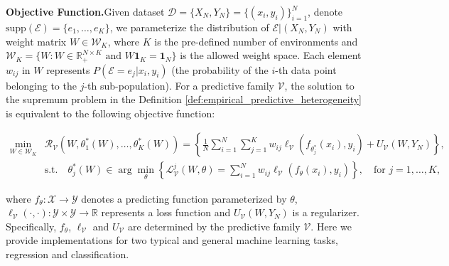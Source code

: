 \textbf{Objective Function.}\quad Given dataset $\mathcal D=\{X_N,Y_N\} = \{(x_i,y_i)\}_{i=1}^N$, denote $\text{supp}(\mathcal{E})=\{e_1, \dots, e_K\}$, we parameterize the distribution of $\mathcal{E}|(X_N,Y_N)$ with weight matrix $W\in\mathcal{W}_K$, where $K$ is the pre-defined number of environments and $\mathcal{W}_K=\{W: W\in\mathbb{R}_+^{N\times K}\text{ and }W\textbf{1}_K=\textbf{1}_N\}$ is the allowed weight space.
Each element $w_{ij}$ in $W$ represents $P(\mathcal{E}=e_j|x_i,y_i)$ (the probability of the $i$-th data point belonging to the $j$-th sub-population).
For a predictive family $\mathcal V$, the solution to the supremum problem in the Definition \ref{def:empirical_predictive_heterogeneity} is equivalent to the following objective function:
\begin{small}
\begin{equation}
\label{equ:bi-level}
\begin{aligned}
	\min\limits_{W\in\mathcal{W}_K} &\mathcal{R}_{\mathcal V}(W,\theta_1^*(W),\dots,\theta^*_K(W))=\left\{\frac{1}{N}\sum_{i=1}^N\sum_{j=1}^K w_{ij}\ell_{\mathcal V}(f_{\theta_j^*}(x_i),y_i) + U_{\mathcal V}(W,Y_N)
	\right\},\\
	&\text{s.t.}\quad  \theta^*_j(W) \in \arg\min_{\theta} \left\{\mathcal{L}_{\mathcal V}^j(W,\theta)=\sum_{i=1}^Nw_{ij}\ell_{\mathcal V}(f_{\theta}(x_i),y_i)\right\},\quad \text{for }j=1,\dots,K,
\end{aligned}		
\end{equation}
\end{small}
where $f_{\theta}:\mathcal{X}\rightarrow \mathcal{Y}$ denotes a predicting function parameterized by $\theta$, $\ell_{\mathcal{V}}(\cdot,\cdot):\mathcal{Y}\times\mathcal{Y}\rightarrow \mathbb{R}$ represents a loss function and $U_{\mathcal V}(W,Y_N)$ is a regularizer.
Specifically, $f_\theta$, $\ell_{\mathcal V}$ and $U_{\mathcal V}$ are determined by the predictive family $\mathcal{V}$. 
Here we provide implementations for two typical and general machine learning tasks, regression and classification.

